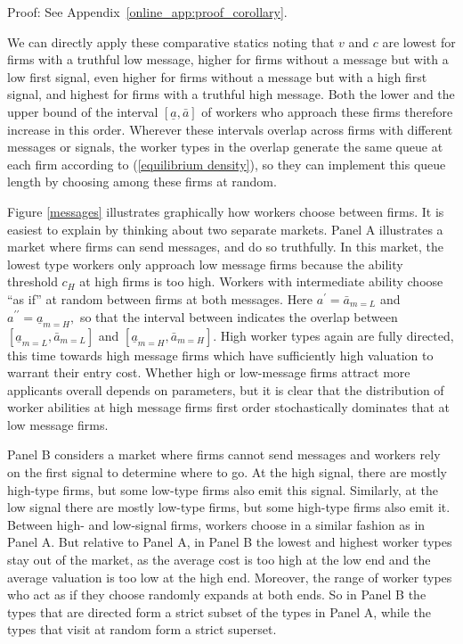 \documentclass[12pt]{article}
\begin{document}
\noindent Proof: See Appendix~\ref{online_app:proof_corollary}.

We can directly apply these comparative statics noting that $v$ and $c$ are lowest for firms with a truthful low message, higher for firms without a message but with a low first signal, even higher for firms without a message but with a high first signal, and highest for firms with a truthful high message. Both the lower and the upper bound of the interval $[\underline{a},\bar{a}]$ of workers who approach these firms therefore increase in this order. Wherever these intervals overlap across firms with different messages or signals, the worker types in the overlap generate the same queue at each firm according to (\ref{equilibrium density}), so they can implement this queue length by choosing among these firms at random.

Figure \ref{messages} illustrates graphically how workers choose between
firms. It is easiest to explain by thinking about two separate markets.
Panel A illustrates a market where firms can send messages, and do so
truthfully. In this market, the lowest type workers only approach low
message firms because the ability threshold $c_{H}$ at high firms is too
high. Workers with intermediate ability choose ``as if'' at random between
firms at both messages. Here $a^{\prime }=\bar{a}_{m=L}$ and $a^{\prime
\prime }=\underline{a}_{m=H},$ so that the interval between indicates the
overlap between $[\underline{a}_{m=L},\bar{a}_{m=L}]$ and $[\underline{a}%
_{m=H},\bar{a}_{m=H}]$. High worker types again are fully directed, this
time towards high message firms which have sufficiently high valuation to
warrant their entry cost. Whether high or low-message firms attract more
applicants overall depends on parameters, but it is clear that the
distribution of worker abilities at high message firms first order
stochastically dominates that at low message firms.

Panel B considers a market where firms cannot send messages and workers rely on the first signal to determine where to go. At the high signal, there are mostly high-type firms, but some low-type firms also emit this signal. Similarly, at the low signal there are mostly low-type firms, but some high-type firms also emit it. Between high- and low-signal firms, workers choose in a similar fashion as in Panel A. But relative to Panel A, in Panel B the lowest and highest worker types stay out of the market, as the average cost is too high at the low end and the average valuation is too low at the high end. Moreover, the range of worker types who act as if they choose randomly expands at both ends. So in Panel B the types that are directed form a strict subset of the types in Panel A, while the types that visit at random form a strict superset.
\end{document}
